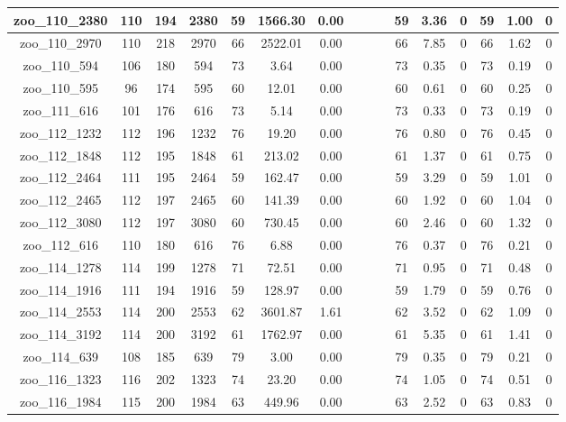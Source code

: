 \begin{landscape}
\begin{longtable}{|c|c|c|c|c|c|c|c|c|c|c|c|c|c|c|c|}
zoo\_110\_2380 & 110 & 194 & 2380 & 59 & 1566.30 & 0.00 &  &  &  & 59 & 3.36 & 0 & 59 & 1.00 & 0 \\ \hline 
zoo\_110\_2970 & 110 & 218 & 2970 & 66 & 2522.01 & 0.00 &  &  &  & 66 & 7.85 & 0 & 66 & 1.62 & 0 \\ \hline 
zoo\_110\_594 & 106 & 180 & 594 & 73 & 3.64 & 0.00 &  &  &  & 73 & 0.35 & 0 & 73 & 0.19 & 0 \\ \hline 
zoo\_110\_595 & 96 & 174 & 595 & 60 & 12.01 & 0.00 &  &  &  & 60 & 0.61 & 0 & 60 & 0.25 & 0 \\ \hline 
zoo\_111\_616 & 101 & 176 & 616 & 73 & 5.14 & 0.00 &  &  &  & 73 & 0.33 & 0 & 73 & 0.19 & 0 \\ \hline 
zoo\_112\_1232 & 112 & 196 & 1232 & 76 & 19.20 & 0.00 &  &  &  & 76 & 0.80 & 0 & 76 & 0.45 & 0 \\ \hline 
zoo\_112\_1848 & 112 & 195 & 1848 & 61 & 213.02 & 0.00 &  &  &  & 61 & 1.37 & 0 & 61 & 0.75 & 0 \\ \hline 
zoo\_112\_2464 & 111 & 195 & 2464 & 59 & 162.47 & 0.00 &  &  &  & 59 & 3.29 & 0 & 59 & 1.01 & 0 \\ \hline 
zoo\_112\_2465 & 112 & 197 & 2465 & 60 & 141.39 & 0.00 &  &  &  & 60 & 1.92 & 0 & 60 & 1.04 & 0 \\ \hline 
zoo\_112\_3080 & 112 & 197 & 3080 & 60 & 730.45 & 0.00 &  &  &  & 60 & 2.46 & 0 & 60 & 1.32 & 0 \\ \hline 
zoo\_112\_616 & 110 & 180 & 616 & 76 & 6.88 & 0.00 &  &  &  & 76 & 0.37 & 0 & 76 & 0.21 & 0 \\ \hline 
zoo\_114\_1278 & 114 & 199 & 1278 & 71 & 72.51 & 0.00 &  &  &  & 71 & 0.95 & 0 & 71 & 0.48 & 0 \\ \hline 
zoo\_114\_1916 & 111 & 194 & 1916 & 59 & 128.97 & 0.00 &  &  &  & 59 & 1.79 & 0 & 59 & 0.76 & 0 \\ \hline 
zoo\_114\_2553 & 114 & 200 & 2553 & 62 & 3601.87 & 1.61 &  &  &  & 62 & 3.52 & 0 & 62 & 1.09 & 0 \\ \hline 
zoo\_114\_3192 & 114 & 200 & 3192 & 61 & 1762.97 & 0.00 &  &  &  & 61 & 5.35 & 0 & 61 & 1.41 & 0 \\ \hline 
zoo\_114\_639 & 108 & 185 & 639 & 79 & 3.00 & 0.00 &  &  &  & 79 & 0.35 & 0 & 79 & 0.21 & 0 \\ \hline 
zoo\_116\_1323 & 116 & 202 & 1323 & 74 & 23.20 & 0.00 &  &  &  & 74 & 1.05 & 0 & 74 & 0.51 & 0 \\ \hline 
zoo\_116\_1984 & 115 & 200 & 1984 & 63 & 449.96 & 0.00 &  &  &  & 63 & 2.52 & 0 & 63 & 0.83 & 0 \\ \hline 

\end{longtable}
\end{landscape}
